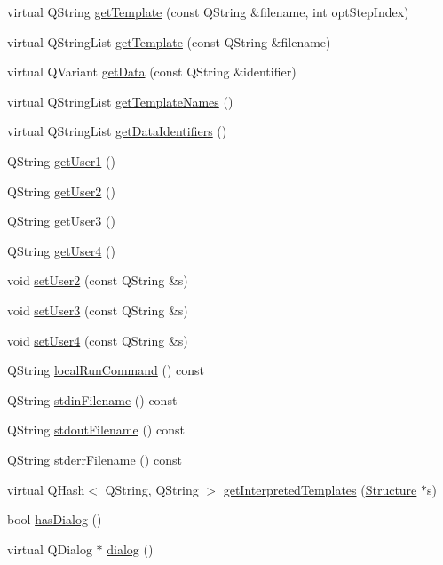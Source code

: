 \begin{DoxyCompactItemize}
\item 
virtual Q\+String \hyperlink{classGlobalSearch_1_1Optimizer_a739ab995b0a4cfcf8b9c8fd86e3a9f24}{get\+Template} (const Q\+String \&filename, int opt\+Step\+Index)
\item 
virtual Q\+String\+List \hyperlink{classGlobalSearch_1_1Optimizer_af46e4dd4e1e7dca1c3389fc8f30ea74e}{get\+Template} (const Q\+String \&filename)
\item 
virtual Q\+Variant \hyperlink{classGlobalSearch_1_1Optimizer_a512b302d7bc91999350ead624259a3cf}{get\+Data} (const Q\+String \&identifier)
\item 
virtual Q\+String\+List \hyperlink{classGlobalSearch_1_1Optimizer_a2819ce65995524d999c61b017192f77d}{get\+Template\+Names} ()
\item 
virtual Q\+String\+List \hyperlink{classGlobalSearch_1_1Optimizer_a4fb3da2a83d851f3ab53b8bc29026886}{get\+Data\+Identifiers} ()
\item 
Q\+String \hyperlink{classGlobalSearch_1_1Optimizer_a414f7b1587c6048451191bc915b640c5}{get\+User1} ()
\item 
Q\+String \hyperlink{classGlobalSearch_1_1Optimizer_a26166bc3bc6c3af4baa0e3f12ac41d38}{get\+User2} ()
\item 
Q\+String \hyperlink{classGlobalSearch_1_1Optimizer_a8b93a20caff4d31524283695f011ab85}{get\+User3} ()
\item 
Q\+String \hyperlink{classGlobalSearch_1_1Optimizer_a854917e1b3ba0bc164ab8edff823a3ae}{get\+User4} ()
\item 
void \hyperlink{classGlobalSearch_1_1Optimizer_a9f53a4945abb35cda9a50fb973d27890}{set\+User2} (const Q\+String \&s)
\item 
void \hyperlink{classGlobalSearch_1_1Optimizer_a19e2d3e7c7a31f1ae94a3a58c0b3a6bf}{set\+User3} (const Q\+String \&s)
\item 
void \hyperlink{classGlobalSearch_1_1Optimizer_a713a94a031fc5fa7c653d54e6ef9fb64}{set\+User4} (const Q\+String \&s)
\item 
Q\+String \hyperlink{classGlobalSearch_1_1Optimizer_aed5eb285d45a001c9520c2ed3a5b57a1}{local\+Run\+Command} () const 
\item 
Q\+String \hyperlink{classGlobalSearch_1_1Optimizer_a5964a9b38d3ae90c8ac36a75d3a35832}{stdin\+Filename} () const 
\item 
Q\+String \hyperlink{classGlobalSearch_1_1Optimizer_a217750aa50431f9948aa8164fb99de0c}{stdout\+Filename} () const 
\item 
Q\+String \hyperlink{classGlobalSearch_1_1Optimizer_acaa83cc6bf1dcc263b92450b4f8cb652}{stderr\+Filename} () const 
\item 
virtual Q\+Hash$<$ Q\+String, Q\+String $>$ \hyperlink{classGlobalSearch_1_1Optimizer_aaaa0f0c28058c716fc065b48090c321f}{get\+Interpreted\+Templates} (\hyperlink{classGlobalSearch_1_1Structure}{Structure} $\ast$s)
\item 
bool \hyperlink{group__dialog_gac4335196cdf08e3555f6d0e152761604}{has\+Dialog} ()
\item 
virtual Q\+Dialog $\ast$ \hyperlink{group__dialog_ga9455d181accc40edd3ca6271fdc1e050}{dialog} ()
\end{DoxyCompactItemize}
